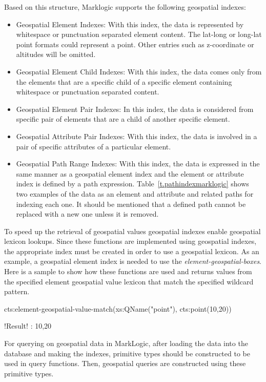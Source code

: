 \documentclass[a4paper,12pt]{article}
\begin{document}
\vspace{10px}
Based on this structure, Marklogic supports the following geospatial indexes:
\begin{itemize}
\item Geospatial Element Indexes: With this index, the data is represented by whitespace or punctuation separated element content. The lat-long or long-lat point formats could represent a point. Other entries such as z-coordinate or altitudes will be omitted.
\item Geospatial Element Child Indexes: With this index, the data comes only from the elements that are a specific child of a specific element containing whitespace or punctuation separated content.
\item Geospatial Element Pair Indexes: In this index, the data is considered from specific pair of elements that are a child of another specific element.
\item Geospatial Attribute Pair Indexes: With this index, the data is involved in a pair of specific attributes of a particular element.
\item Geospatial Path Range Indexes: With this index, the data is expressed in the same manner as a geospatial element index and the element or attribute index is defined by a path expression. Table~\ref{t.pathindexmarklogic} shows two examples of the data as an element and attribute and related paths for indexing each one. It should be mentioned that a defined path cannot be replaced with a new one unless it is removed.
\end{itemize}

To speed up the retrieval of geospatial values geospatial indexes enable geospatial lexicon lookups. Since these functions are implemented using geospatial indexes, the appropriate index must be created in order to use a geospatial lexicon. As an example, a geospatial element index is needed to use the \textit{element-geospatial-boxes}. Here is a sample to show how these functions are used and returns values from the specified element geospatial value lexicon that match the specified wildcard pattern.
\vspace{10px}
\begin{fakeJSON}[escapechar=\!]
cts:element-geospatial-value-match(xs:QName("point"),
	cts:point(10,20))

!\colorbox{light-gray}{Result}! : 10,20
\end{fakeJSON}
\vspace{10px}

For querying on geospatial data in MarkLogic, after loading the data into the database and making the indexes, primitive types should be constructed to be used in query functions. Then, geospatial queries are constructed using these primitive types. 
\end{document}
